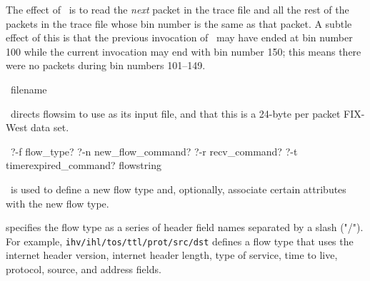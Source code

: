 \documentclass{article}
\begin{document}
The effect of \cmdname\ is to read the \emph{next}
packet in the trace file and all the rest of the packets in the trace
file whose bin number is the same as that packet.  A subtle effect of
this is that the previous invocation of \cmdname\ may
have ended at bin number 100 while the current invocation may end with
bin number 150; this means there were no packets during bin numbers
101--149.

\manend

\label{sec:fsim_set_fix_file}

\SYNOPSIS \cmdname\ filename

\DESCRIPTION

\cmdname\ directs flowsim to use  as
its input file, and that this is a 24-byte per packet FIX-West data
set.

\SEEALSO


\manend

\label{sec:fsim_set_flow_type}

\SYNOPSIS \cmdname\ ?-f flow\_type? ?-n new\_flow\_command? ?-r recv\_command? ?-t timerexpired\_command? flowstring

\DESCRIPTION

\cmdname\ is used to define a new flow type and, optionally, associate
certain attributes with the new flow type.

 specifies the flow type as a series of header field
names separated by a slash ("/").  For example,
\texttt{ihv/ihl/tos/ttl/prot/src/dst} defines a flow type that
uses the internet header version, internet header length, type of
service, time to live, protocol, source, and address fields.
\end{document}
